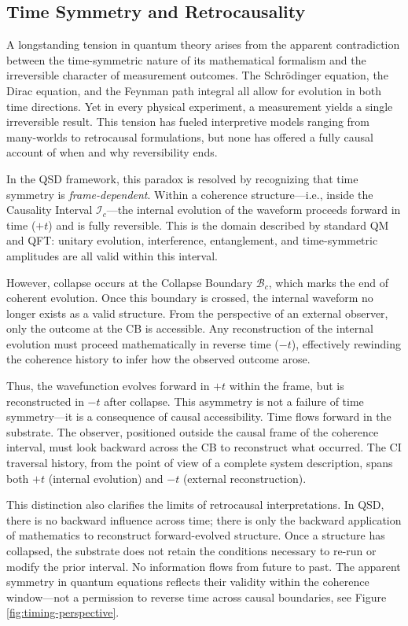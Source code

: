 \documentclass[entropy,article,submit,pdftex,moreauthors]{Definitions/mdpi}
\begin{document}
\subsection{Time Symmetry and Retrocausality}
\label{subsec:timesymmetry}

A longstanding tension in quantum theory arises from the apparent contradiction between the time-symmetric nature of its mathematical formalism and the irreversible character of measurement outcomes. The Schrödinger equation, the Dirac equation, and the Feynman path integral all allow for evolution in both time directions. Yet in every physical experiment, a measurement yields a single irreversible result. This tension has fueled interpretive models ranging from many-worlds to retrocausal formulations, but none has offered a fully causal account of when and why reversibility ends.

In the QSD framework, this paradox is resolved by recognizing that time symmetry is \textit{frame-dependent}. Within a coherence structure—i.e., inside the Causality Interval \( \mathcal{I}_c \)—the internal evolution of the waveform proceeds forward in time (\( +t \)) and is fully reversible. This is the domain described by standard QM and QFT: unitary evolution, interference, entanglement, and time-symmetric amplitudes are all valid within this interval.

However, collapse occurs at the Collapse Boundary \( \mathcal{B}_c \), which marks the end of coherent evolution. Once this boundary is crossed, the internal waveform no longer exists as a valid structure. From the perspective of an external observer, only the outcome at the CB is accessible. Any reconstruction of the internal evolution must proceed mathematically in reverse time (\( -t \)), effectively rewinding the coherence history to infer how the observed outcome arose.

Thus, the wavefunction evolves forward in \( +t \) within the frame, but is reconstructed in \( -t \) after collapse. This asymmetry is not a failure of time symmetry—it is a consequence of causal accessibility. Time flows forward in the substrate. The observer, positioned outside the causal frame of the coherence interval, must look backward across the CB to reconstruct what occurred. The CI traversal history, from the point of view of a complete system description, spans both \( +t \) (internal evolution) and \( -t \) (external reconstruction).

This distinction also clarifies the limits of retrocausal interpretations. In QSD, there is no backward influence across time; there is only the backward application of mathematics to reconstruct forward-evolved structure. Once a structure has collapsed, the substrate does not retain the conditions necessary to re-run or modify the prior interval. No information flows from future to past. The apparent symmetry in quantum equations reflects their validity within the coherence window—not a permission to reverse time across causal boundaries, see Figure \ref{fig:timing-perspective}.
\end{document}
